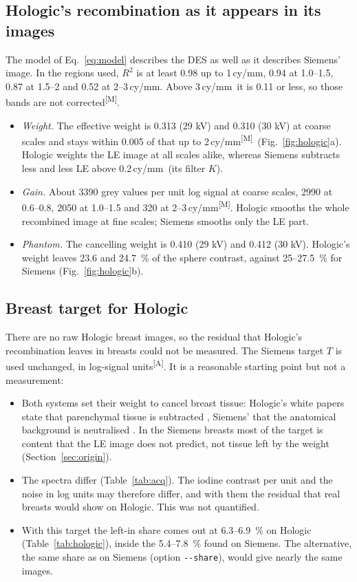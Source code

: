 \documentclass[11pt,a4paper]{article}
\newcommand{\M}{\textsuperscript{[M]}}
\newcommand{\As}{\textsuperscript{[A]}}
\newcommand{\cymm}{\,cy/mm}
\newcommand{\code}[1]{\texttt{#1}}
\begin{document}
\subsection{Hologic's recombination as it appears in its images}
The model of Eq.~\eqref{eq:model} describes the DES as well as it describes Siemens' image. In the regions used, $R^2$ is at least
0.98 up to 1\cymm, 0.94 at 1.0--1.5, 0.87 at 1.5--2 and 0.52 at 2--3\cymm. Above 3\cymm\ it is 0.11 or less, so
those bands are not corrected\M.
\begin{itemize}
\item \emph{Weight.} The effective weight is 0.313 (29 kV) and 0.310 (30 kV) at coarse scales and stays within 0.005
of that up to 2\cymm\M\ (Fig.~\ref{fig:hologic}a). Hologic weights the LE image at all scales alike, whereas Siemens
subtracts less and less LE above 0.2\cymm\ (its filter $K$).
\item \emph{Gain.} About 3390 grey values per unit log signal at coarse scales, 2990 at 0.6--0.8, 2050 at 1.0--1.5
and 320 at 2--3\cymm\M. Hologic smooths the whole recombined image at fine scales; Siemens smooths only the LE part.
\item \emph{Phantom.} The cancelling weight is 0.410 (29 kV) and 0.412 (30 kV). Hologic's weight leaves 23.6 and
24.7~\% of the sphere contrast, against 25--27.5~\% for Siemens (Fig.~\ref{fig:hologic}b).
\end{itemize}

\subsection{Breast target for Hologic}\label{sec:hologictarget}
There are no raw Hologic breast images, so the residual that Hologic's recombination leaves in breasts could not be
measured. The Siemens target $T$ is used unchanged, in log-signal units\As. It is a reasonable starting point but not
a measurement:
\begin{itemize}
\item Both systems set their weight to cancel breast tissue: Hologic's white papers state that parenchymal tissue
is subtracted \cite{alsheik2020,smith2014}, Siemens' that the anatomical background is neutralised
\cite{korporaal2018}. In the Siemens breasts most of the target is content that the LE image does not predict,
not tissue left by the weight (Section~\ref{sec:origin}).
\item The spectra differ (Table~\ref{tab:acq}). The iodine contrast per unit and the noise in log units may therefore
differ, and with them the residual that real breasts would show on Hologic. This was not quantified.
\item With this target the left-in share comes out at 6.3--6.9~\% on Hologic (Table~\ref{tab:hologic}), inside the
5.4--7.8~\% found on Siemens. The alternative, the same share as on Siemens (option \code{-{}-share}), would give
nearly the same images.
\end{itemize}
\end{document}
